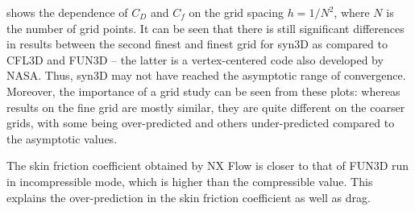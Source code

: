  shows the dependence of $C_D$ and $C_f$ on the grid spacing $h = 1/N^2$, where $N$ is the number of grid points. It can be seen that there is still significant differences in results between the second finest and finest grid for syn3D as compared to CFL3D and FUN3D -- the latter is a vertex-centered code also developed by NASA. Thus, syn3D may not have reached the asymptotic range of convergence. Moreover, the importance of a grid study can be seen from these plots: whereas results on the fine grid are mostly similar, they are quite different on the coarser grids, with some being over-predicted and others under-predicted compared to the asymptotic values.

The skin friction coefficient obtained by NX Flow is closer to that of FUN3D run in incompressible mode, which is higher than the compressible value. This explains the over-prediction in the skin friction coefficient as well as drag.

